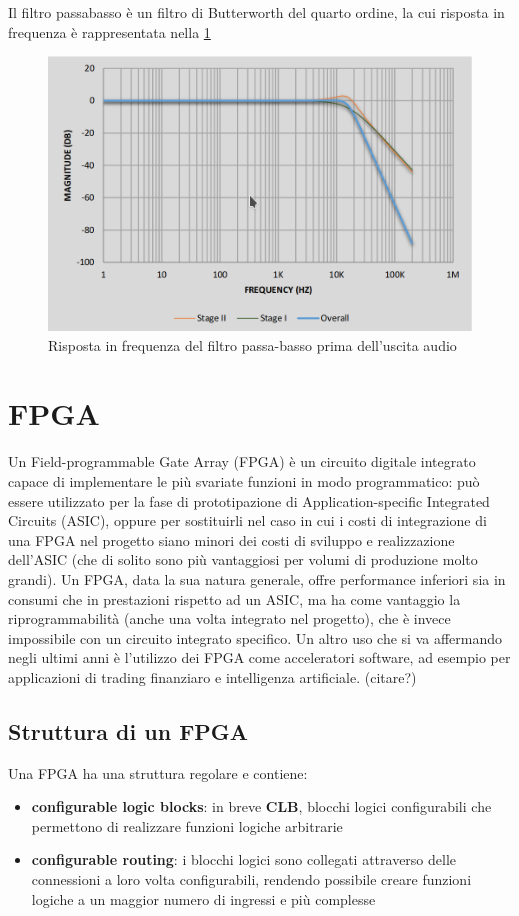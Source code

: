 Il filtro passabasso è un filtro di Butterworth del quarto ordine, la cui risposta
in frequenza è rappresentata nella \cref{fig:freq_resp}
\begin{figure}[h!]
	\centering
	\def\svgwidth{\columnwidth}
	\includegraphics[width=0.6\columnwidth]{TeX_files/freq_response.png}
    \caption{Risposta in frequenza del filtro passa-basso prima dell'uscita audio}
    \label{fig:freq_resp}
\end{figure}

\section{FPGA}
Un Field-programmable Gate Array (FPGA) è un circuito digitale integrato
capace di implementare le più svariate funzioni in modo programmatico:
può essere utilizzato per la fase di prototipazione di Application-specific
Integrated Circuits (ASIC), oppure per sostituirli nel caso in cui i costi
di integrazione di una FPGA nel progetto siano minori dei costi di sviluppo
e realizzazione dell'ASIC (che di solito sono più vantaggiosi per volumi
di produzione molto grandi).
Un FPGA, data la sua natura generale, offre performance inferiori sia
in consumi che in prestazioni rispetto ad un ASIC, ma ha come vantaggio
la riprogrammabilità (anche una volta integrato nel progetto), che
è invece impossibile con un circuito integrato specifico. 
Un altro uso che si va affermando negli ultimi anni è l'utilizzo dei
FPGA come acceleratori software, ad esempio per applicazioni di 
trading finanziaro e intelligenza artificiale. (citare?)

\subsection{Struttura di un FPGA}
Una FPGA ha una struttura regolare e contiene:
\begin{itemize}
    \item \textbf{configurable logic blocks}: in breve \textbf{CLB}, blocchi
            logici configurabili che permettono di realizzare funzioni
            logiche arbitrarie
    \item \textbf{configurable routing}: i blocchi logici sono collegati
          attraverso delle connessioni a loro volta configurabili,
          rendendo possibile creare funzioni logiche a un maggior numero
          di ingressi e più complesse
\end{itemize}

